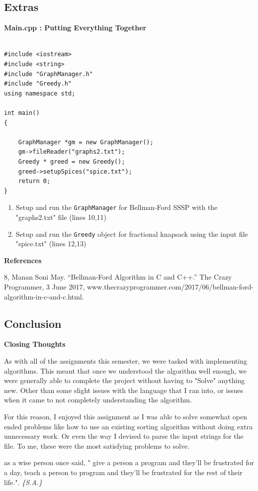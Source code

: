\documentclass[letterpaper, 10pt]{article}
\begin{document}
\subsection{Extras}
\textbf{Main.cpp : Putting Everything Together}
 \begin{addmargin}[-5em]{1em}
\begin{small}
\begin{verbatim}

#include <iostream>
#include <string>
#include "GraphManager.h"
#include "Greedy.h"
using namespace std;

int main()
{

	GraphManager *gm = new GraphManager();
	gm->fileReader("graphs2.txt");
	Greedy * greed = new Greedy();
	greed->setupSpices("spice.txt");
	return 0;
}
\end{verbatim}
\end{small}
\end{addmargin}   

\begin{enumerate}
    \item Setup and run the \texttt{GraphManager} for Bellman-Ford SSSP with the "graphs2.txt" file (lines 10,11)
    \item Setup and run the \texttt{Greedy} object for fractional knapsack using the input file "spice.txt" (lines 12,13)
\end{enumerate}

\textbf{References}

8, Manan Soni May. “Bellman-Ford Algorithm in C and C++.” The Crazy Programmer, 3 June 2017, www.thecrazyprogrammer.com/2017/06/bellman-ford-algorithm-in-c-and-c.html. 



\vspace{2.5em}

\subsection{Conclusion}
\textbf{Closing Thoughts}

As with all of the assignments this semester, we were tasked with implementing algorithms. This meant that once we understood the algorithm well enough, we were generally able to complete the project without having to "Solve" anything new. Other than some slight issues with the language that I ran into, or issues when it came to not completely understanding the algorithm. 

For this reason, I enjoyed this assignment as I was able to solve somewhat open ended problems like how to use an existing sorting algorithm without doing extra unnecessary work. Or even the way I devised to parse the input strings for the file. To me, these were the most satisfying problems to solve.

\vspace{1em}
\newline

as a wise person once said, "
give a person a program and they'll be
frustrated for a day, teach a person to
program and they'll be frustrated for the
rest of their life.".
 \vspace{.5em}
{\textit{\color{red}\huge{\{S.A.\}}}}

\vspace{1em}
\end{document}

